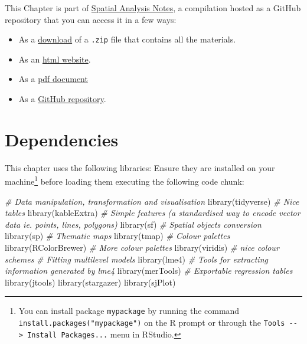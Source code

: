 \documentclass[
]{book}
\newenvironment{Shaded}{\begin{snugshade}}{\end{snugshade}}
\newcommand{\CommentTok}[1]{\textcolor[rgb]{0.56,0.35,0.01}{\textit{#1}}}
\newcommand{\FunctionTok}[1]{\textcolor[rgb]{0.00,0.00,0.00}{#1}}
\newcommand{\NormalTok}[1]{#1}
\providecommand{\tightlist}{%
  \setlength{\itemsep}{0pt}\setlength{\parskip}{0pt}}
\begin{document}
This Chapter is part of \href{index.html}{Spatial Analysis Notes}, a compilation hosted as a GitHub repository that you can access it in a few ways:

\begin{itemize}
\tightlist
\item
  As a \href{https://github.com/GDSL-UL/san/archive/master.zip}{download} of a \texttt{.zip} file that contains all the materials.
\item
  As an \href{https://gdsl-ul.github.io/san/multilevel-modelling-part-1.html}{html
  website}.
\item
  As a \href{https://gdsl-ul.github.io/san/spatial_analysis_notes.pdf}{pdf
  document}
\item
  As a \href{https://github.com/GDSL-UL/san}{GitHub repository}.
\end{itemize}

\hypertarget{dependencies-4}{%
\section{Dependencies}\label{dependencies-4}}

This chapter uses the following libraries: Ensure they are installed on your machine\footnote{You can install package \texttt{mypackage} by running the command \texttt{install.packages("mypackage")} on the R prompt or through the \texttt{Tools\ -\/-\textgreater{}\ Install\ Packages...} menu in RStudio.} before loading them executing the following code chunk:

\begin{Shaded}
\begin{Highlighting}[]
\CommentTok{\# Data manipulation, transformation and visualisation}
\FunctionTok{library}\NormalTok{(tidyverse)}
\CommentTok{\# Nice tables}
\FunctionTok{library}\NormalTok{(kableExtra)}
\CommentTok{\# Simple features (a standardised way to encode vector data ie. points, lines, polygons)}
\FunctionTok{library}\NormalTok{(sf) }
\CommentTok{\# Spatial objects conversion}
\FunctionTok{library}\NormalTok{(sp) }
\CommentTok{\# Thematic maps}
\FunctionTok{library}\NormalTok{(tmap) }
\CommentTok{\# Colour palettes}
\FunctionTok{library}\NormalTok{(RColorBrewer) }
\CommentTok{\# More colour palettes}
\FunctionTok{library}\NormalTok{(viridis) }\CommentTok{\# nice colour schemes}
\CommentTok{\# Fitting multilevel models}
\FunctionTok{library}\NormalTok{(lme4)}
\CommentTok{\# Tools for extracting information generated by lme4}
\FunctionTok{library}\NormalTok{(merTools)}
\CommentTok{\# Exportable regression tables}
\FunctionTok{library}\NormalTok{(jtools)}
\FunctionTok{library}\NormalTok{(stargazer)}
\FunctionTok{library}\NormalTok{(sjPlot)}
\end{Highlighting}
\end{Shaded}
\end{document}
